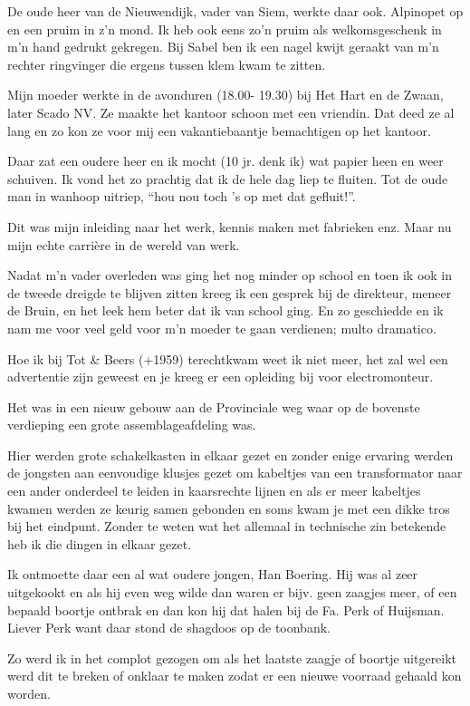 \documentclass[10pt,twoside,openright]{memoir}
\begin{document}
De oude heer van de Nieuwendijk, vader van Siem, werkte daar ook. Alpinopet op en een pruim in z’n mond. Ik heb ook eens zo’n pruim als welkomsgeschenk in m’n hand gedrukt gekregen. Bij Sabel ben ik een nagel kwijt geraakt van m’n rechter ringvinger die ergens tussen klem kwam te zitten.

Mijn moeder werkte in de avonduren (18.00- 19.30) bij Het Hart en de Zwaan, later Scado NV. Ze maakte het kantoor schoon met een vriendin. Dat deed ze al lang en zo kon ze voor mij een vakantiebaantje bemachtigen op het kantoor. 

Daar zat een oudere heer en ik mocht (10 jr. denk ik) wat papier heen en weer schuiven. Ik vond het zo prachtig dat ik de hele dag liep te fluiten. Tot de oude man in wanhoop uitriep, “hou nou toch ’s op met dat gefluit!”.

Dit was mijn inleiding naar het werk, kennis maken met fabrieken enz. Maar nu mijn echte carrière in de wereld van werk.

Nadat m’n vader overleden was ging het nog minder op school en toen ik ook in de tweede dreigde te blijven zitten kreeg ik een gesprek bij de direkteur, meneer de Bruin, en het leek hem beter dat ik van school ging. En zo geschiedde en ik nam me voor veel geld voor m’n moeder te gaan verdienen; multo dramatico.

Hoe ik bij Tot \& Beers (+1959) terechtkwam weet ik niet meer, het zal wel een advertentie zijn geweest en je kreeg er een opleiding bij voor electromonteur.

Het was in een nieuw gebouw aan de Provinciale weg waar op de bovenste verdieping een grote assemblageafdeling was. 

Hier werden grote schakelkasten in elkaar gezet en zonder enige ervaring werden de jongsten aan eenvoudige klusjes gezet om kabeltjes van een transformator naar een ander onderdeel te leiden in kaarsrechte lijnen en als er meer kabeltjes kwamen werden ze keurig samen gebonden en soms kwam je met een dikke tros bij het eindpunt. Zonder te weten wat het allemaal in technische zin betekende heb ik die dingen in elkaar gezet. 

Ik ontmoette daar een al wat oudere jongen, Han Boering. Hij was al zeer uitgekookt en als hij even weg wilde dan waren er bijv. geen zaagjes meer, of een bepaald boortje ontbrak en dan kon hij dat halen bij de Fa. Perk of Huijsman. Liever Perk want daar stond de shagdoos op de toonbank. 

Zo werd ik in het complot gezogen om als het laatste zaagje of boortje uitgereikt werd dit te breken of onklaar te maken zodat er een nieuwe voorraad gehaald kon worden. 
\end{document}
